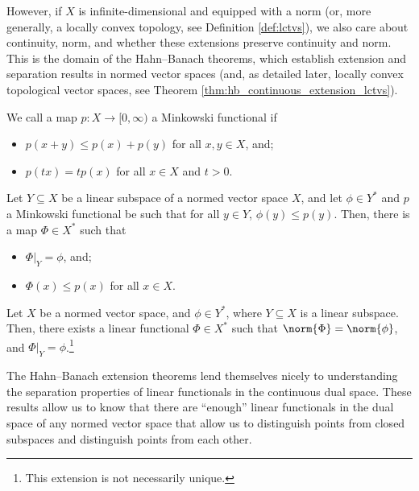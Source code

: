 However, if $X$ is infinite-dimensional and equipped with a norm (or, more generally, a locally convex topology, see Definition \ref{def:lctvs}), we also care about continuity, norm, and whether these extensions preserve continuity and norm. This is the domain of the Hahn--Banach theorems, which establish extension and separation results in normed vector spaces (and, as detailed later, locally convex topological vector spaces, see Theorem \ref{thm:hb_continuous_extension_lctvs}).
\begin{definition}
  We call a map $p\colon X\rightarrow [0,\infty)$ a Minkowski functional if
  \begin{itemize}
    \item $p\left(x + y\right)\leq p\left(x\right) + p\left(y\right)$ for all $x,y\in X$, and;
    \item $p\left(tx\right) = tp\left(x\right)$ for all $x\in X$ and $t > 0$.
  \end{itemize}
\end{definition}
\begin{theorem}\label{thm:hbm_extension}
  Let $Y\subseteq X$ be a linear subspace of a normed vector space $X$, and let $\phi\in Y^{\ast}$ and $p$ a Minkowski functional be such that for all $y\in Y$, $\phi\left(y\right) \leq p\left(y\right)$. Then, there is a map $\Phi\in X^{\ast}$ such that
  \begin{itemize}
    \item $\Phi|_{Y} = \phi$, and;
    \item $\Phi\left(x\right) \leq p\left(x\right)$ for all $x\in X$.
  \end{itemize}
\end{theorem}
\begin{theorem}\label{thm:hb_continuous_extension}
  Let $X$ be a normed vector space, and $\phi\in Y^{\ast}$, where $Y\subseteq X$ is a linear subspace. Then, there exists a linear functional $\Phi\in X^{\ast}$ such that $\norm{\Phi} = \norm{\phi}$, and $\Phi|_{Y} = \phi$.\footnote{This extension is not necessarily unique.}
\end{theorem}
The Hahn--Banach extension theorems lend themselves nicely to understanding the separation properties of linear functionals in the continuous dual space. These results allow us to know that there are ``enough'' linear functionals in the dual space of any normed vector space that allow us to distinguish points from closed subspaces and distinguish points from each other.
